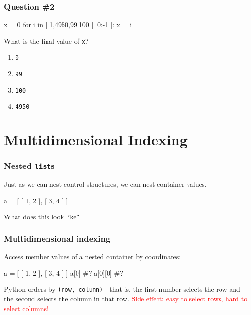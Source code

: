 \documentclass[11pt]{beamer}
\begin{document}
\begin{frame}[fragile]
\frametitle{Question \#2}
\Enlarge

\begin{semiverbatim}
x = 0
for i in [ 1,4950,99,100 ][ 0:-1 ]:
    x = i
\end{semiverbatim}
  What is the final value of \texttt{x}?
  \begin{enumerate}[label=\Alph*]
  \item  \texttt{0}
  \item  \texttt{99}
  \item  \texttt{100}
  \item  \texttt{4950}
  \end{enumerate}
\end{frame}

\section{Multidimensional Indexing}

\begin{frame}[fragile]
  \frametitle{Nested \texttt{list}s}
  \Enlarge

  \begin{itemize}
  \myitem  Just as we can nest control structures, we can nest container values.
  \end{itemize}
  \begin{semiverbatim}
a = [ [ 1, 2 ], [ 3, 4 ] ]
  \end{semiverbatim}
  \begin{itemize}
  \myitem  What does this look like?
  \end{itemize}
\end{frame}

\begin{frame}[fragile]
  \frametitle{Multidimensional indexing}
  \Enlarge

  \begin{itemize}
  \myitem  Access member values of a nested container by coordinates:
  \end{itemize}
  \begin{semiverbatim}
a = [ [ 1, 2 ], [ 3, 4 ] ]
a[0]    #?
a[0][0] #?
  \end{semiverbatim}
  \begin{itemize}
  \myitem  Python orders by \texttt{(row, column)}---that is, the first number selects the row and the second selects the column in that row.
  \myitem  \textcolor{red}{Side effect:  easy to select rows, hard to select columns!}
  \end{itemize}
\end{frame}
\end{document}
